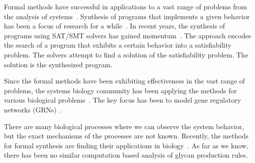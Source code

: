 Formal methods have successful in applications to a vast range of
problems from the analysis of
systems~\cite{biere1999symbolic2,biere2003bounded,lattice77,ClarkeCEGAR}.
Synthesis of programs that implements a given behavior
has been a focus of research for a while~\cite{PnueliSynthesis}.
In recent years, the synthesis of programs using SAT/SMT solvers
has gained momentum~\cite{SrivastavaSynthesis,Solar-Lezama2005,sygus}.
%
The approach encodes the search of a program that exhibits a certain
behavior into a satisfiability problem.
%
The solvers attempt to find a solution of the satisfiability problem.
%
The solution is the synthesized program.




Since the formal methods have been exhibiting effectiveness in the vast
range of problems, the
systems biology community has been applying the methods for various
biological problems~\cite{fisher2007executable}.
The key focus has been to model gene regulatory networks (GRNs)~\cite{wang2012BooleanOverview,delayedCTMC}.

There are many biological processes where we can observe the system behavior,
but the exact mechanisms of the processes are not known.
%
Recently, the methods for formal synthesis are finding their applications in biology~\cite{dunn2014defining,xuPluripotency,booleanModelKarp13,paoletti2014analyzing,koksal2013synthesis,fisher2015synthesising}.
%
As far as we know, there has been no similar computation based analysis of glycan production rules.





